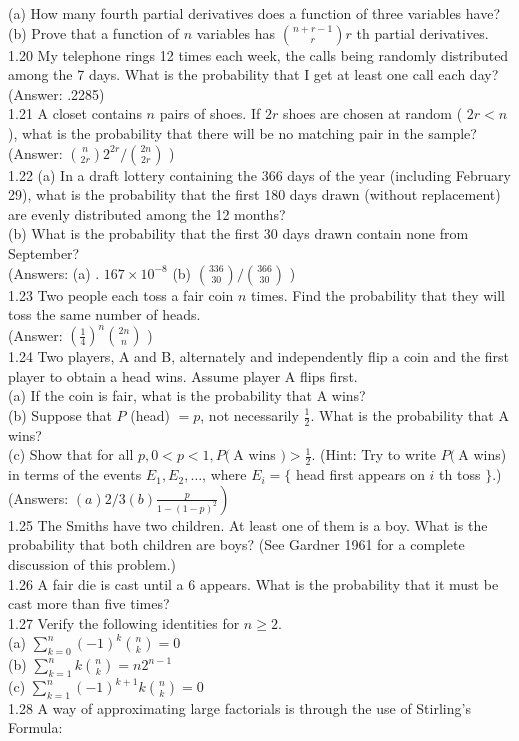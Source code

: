 \documentclass[10pt]{article}
\begin{document}
(a) How many fourth partial derivatives does a function of three variables have?\\
(b) Prove that a function of $n$ variables has $\binom{n+r-1}{r} r$ th partial derivatives.\\
1.20 My telephone rings 12 times each week, the calls being randomly distributed among the 7 days. What is the probability that I get at least one call each day?\\
(Answer: .2285)\\
1.21 A closet contains $n$ pairs of shoes. If $2 r$ shoes are chosen at random ( $2 r<n$ ), what is the probability that there will be no matching pair in the sample?\\
(Answer: $\binom{n}{2 r} 2^{2 r} /\binom{2 n}{2 r}$ )\\
1.22 (a) In a draft lottery containing the 366 days of the year (including February 29), what is the probability that the first 180 days drawn (without replacement) are evenly distributed among the 12 months?\\
(b) What is the probability that the first 30 days drawn contain none from September?\\
(Answers: (a) . $167 \times 10^{-8}$ (b) $\binom{336}{30} /\binom{366}{30}$ )\\
1.23 Two people each toss a fair coin $n$ times. Find the probability that they will toss the same number of heads.\\
(Answer: $\left(\frac{1}{4}\right)^{n}\binom{2 n}{n}$ )\\
1.24 Two players, A and B, alternately and independently flip a coin and the first player to obtain a head wins. Assume player A flips first.\\
(a) If the coin is fair, what is the probability that A wins?\\
(b) Suppose that $P$ (head) $=p$, not necessarily $\frac{1}{2}$. What is the probability that A wins?\\
(c) Show that for all $p, 0<p<1, P(\mathrm{~A}$ wins $)>\frac{1}{2}$. (Hint: Try to write $P(\mathrm{~A}$ wins) in terms of the events $E_{1}, E_{2}, \ldots$, where $E_{i}=\{$ head first appears on $i$ th toss $\}$.)\\
(Answers: $\left.(a) 2 / 3(b) \frac{p}{1-(1-p)^{2}}\right)$\\
1.25 The Smiths have two children. At least one of them is a boy. What is the probability that both children are boys? (See Gardner 1961 for a complete discussion of this problem.)\\
1.26 A fair die is cast until a 6 appears. What is the probability that it must be cast more than five times?\\
1.27 Verify the following identities for $n \geq 2$.\\
(a) $\sum_{k=0}^{n}(-1)^{k}\binom{n}{k}=0$\\
(b) $\sum_{k=1}^{n} k\binom{n}{k}=n 2^{n-1}$\\
(c) $\sum_{k=1}^{n}(-1)^{k+1} k\binom{n}{k}=0$\\
1.28 A way of approximating large factorials is through the use of Stirling's Formula:
\end{document}

